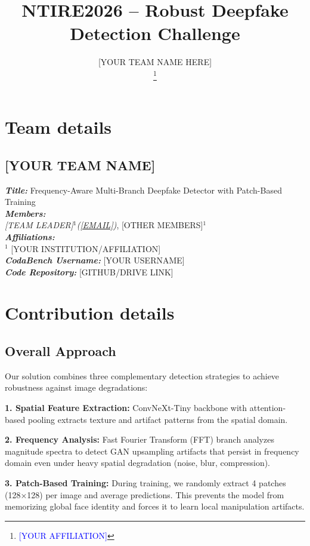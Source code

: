 \documentclass{article}
\title{NTIRE2026 -- Robust Deepfake Detection Challenge}
\author{[YOUR TEAM NAME HERE]\\
[YOUR NAME]\thanks{\textcolor{blue}{[YOUR AFFILIATION]}}\\
}
\begin{document}
\maketitle

\section{Team details}

\subsection*{[YOUR TEAM NAME]}
\noindent\textit{\textbf{Title: }} Frequency-Aware Multi-Branch Deepfake Detector with Patch-Based Training\\
\noindent\textit{\textbf{Members:}}\\ 
\textit{[TEAM LEADER]$^1$(\href{mailto:[EMAIL]}{[EMAIL]})}, [OTHER MEMBERS]$^{1}$\\
\noindent\textit{\textbf{Affiliations: }}\\
$^1$ [YOUR INSTITUTION/AFFILIATION]\\

\noindent\textit{\textbf{CodaBench Username:}} [YOUR USERNAME]\\
\noindent\textit{\textbf{Code Repository:}} [GITHUB/DRIVE LINK]

\section{Contribution details}

\subsection{Overall Approach}
Our solution combines three complementary detection strategies to achieve robustness against image degradations:

\textbf{1. Spatial Feature Extraction:} ConvNeXt-Tiny backbone with attention-based pooling extracts texture and artifact patterns from the spatial domain.

\textbf{2. Frequency Analysis:} Fast Fourier Transform (FFT) branch analyzes magnitude spectra to detect GAN upsampling artifacts that persist in frequency domain even under heavy spatial degradation (noise, blur, compression).

\textbf{3. Patch-Based Training:} During training, we randomly extract 4 patches (128×128) per image and average predictions. This prevents the model from memorizing global face identity and forces it to learn local manipulation artifacts.
\end{document}
